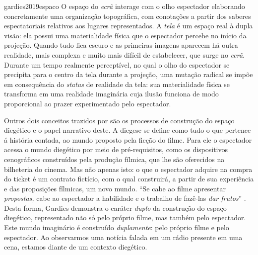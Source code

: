 \begin{displaycquote}[22-23]{gardies2019espaco}
O espaço do \emph{ecrã} interage com o olho espectador elaborando
concretamente uma organização topográfica, com conotações a partir dos
saberes espectatoriais relativos aos lugares representados. A
\emph{tela} é um espaço real à dupla visão: ela possui uma
materialidade física que o espectador percebe no início da projeção.
Quando tudo fica escuro e as primeiras imagens aparecem há outra
realidade, mais complexa e muito mais difícil de estabelecer, que surge
no \emph{ecrã}. Durante um tempo realmente perceptível, no qual o olho
do espectador se precipita para o centro da tela durante a projeção,
uma mutação radical se impõe em consequência do \emph{status} de
realidade da tela: sua materialidade física se transforma em uma
realidade imaginária cuja ilusão funciona de modo proporcional ao
prazer experimentado pelo espectador.
\end{displaycquote}

Outros dois conceitos trazidos por \textcite{gardies2019espaco} são
os processos de construção do espaço diegético e o papel
	narrativo deste. A diegese se define como tudo o que pertence á
história contada, ao mundo proposto pela ficção do filme. Para ele o
espectador acessa o mundo diegético por meio de pré-requisitos, como os
dispositivos cenográficos construídos pela produção fílmica, que lhe
são oferecidos na bilheteria do cinema. Mas não apenas isto: o que o
espectador adquire na compra do ticket é um contrato fictício, com o
qual construirá, a partir de sua experiência e das proposições
fílmicas, um novo mundo. \enquote{Se cabe ao filme apresentar
	\emph{propostas,} cabe ao espectador a habilidade e o trabalho de
  fazê-las \emph{dar frutos}} 
\parencite[62]{gardies2019espaco}. Desta forma, Gardies demonstra o caráter
\emph{duplo} da construção do espaço diegético, representado não só
pelo próprio filme, mas também pelo espectador. Este mundo imaginário é
construído \emph{duplamente}: pelo próprio filme e pelo espectador. Ao
observarmos uma notícia falada em um rádio presente em uma cena,
estamos diante de um contexto diegético.

